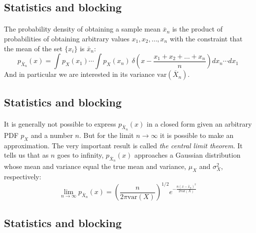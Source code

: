 \documentclass[%
twoside,                 %
final,                   %
10pt]{article}
\begin{document}
\subsection*{Statistics and blocking}

\paragraph{}
The probability density of obtaining a sample mean $\bar x_n$
is the product of probabilities of obtaining arbitrary values $x_1,
x_2,\dots,x_n$ with the constraint that the mean of the set $\{x_i\}$
is $\bar x_n$:
\[
p_{\overline X_n}(x) = \int p_X^{\phantom X}(x_1)\cdots
\int p_X^{\phantom X}(x_n)\ 
\delta\!\left(x - \frac{x_1+x_2+\dots+x_n}{n}\right)dx_n \cdots dx_1
\]
And in particular we are interested in its variance $\mathrm{var}(\overline X_n)$.





\subsection*{Statistics and blocking}

\paragraph{}
It is generally not possible to express $p_{\overline X_n}(x)$ in a
closed form given an arbitrary PDF $p_X^{\phantom X}$ and a number
$n$. But for the limit $n\to\infty$ it is possible to make an
approximation. The very important result is called \emph{the central limit theorem}. It tells us that as $n$ goes to infinity,
$p_{\overline X_n}(x)$ approaches a Gaussian distribution whose mean
and variance equal the true mean and variance, $\mu_{X}^{\phantom X}$
and $\sigma_{X}^{2}$, respectively:
\begin{equation}
\lim_{n\to\infty} p_{\overline X_n}(x) =
\left(\frac{n}{2\pi\mathrm{var}(X)}\right)^{1/2}
e^{-\frac{n(x-\bar x_n)^2}{2\mathrm{var}(X)}}
\label{eq:central_limit_gaussian}
\end{equation}



\subsection*{Statistics and blocking}
\end{document}
